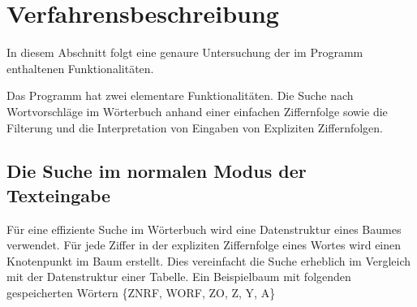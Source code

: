%

\chapter{Verfahrensbeschreibung}

In diesem Abschnitt folgt eine genaure Untersuchung der im Programm enthaltenen Funktionalitäten. 

Das Programm hat zwei elementare Funktionalitäten. Die Suche nach Wortvorschläge im Wörterbuch anhand einer einfachen Ziffernfolge sowie die Filterung und die Interpretation von Eingaben von Expliziten Ziffernfolgen.
\section{Die Suche im normalen Modus der Texteingabe}
\label{Suche}

Für eine effiziente Suche im Wörterbuch wird eine Datenstruktur eines Baumes verwendet. Für jede Ziffer in der expliziten Ziffernfolge eines Wortes wird einen Knotenpunkt im Baum erstellt. Dies vereinfacht die Suche erheblich im Vergleich mit der Datenstruktur einer Tabelle. 
Ein Beispielbaum mit folgenden gespeicherten Wörtern
\{ZNRF, WORF, ZO, Z, Y, A\}


